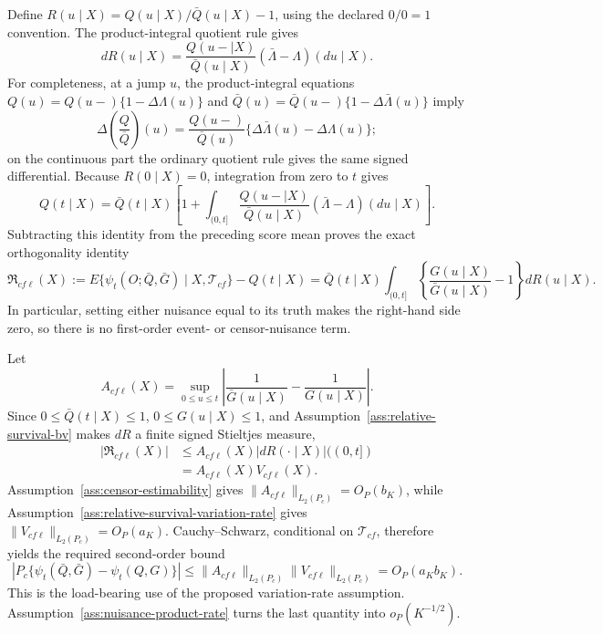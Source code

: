 Define \(R(u\mid X)=Q(u\mid X)/\bar Q(u\mid X)-1\), using the declared \(0/0=1\) convention.  The product-integral quotient rule gives
\[
dR(u\mid X)=
\frac{Q(u-\mid X)}{\bar Q(u\mid X)}
(\bar\Lambda-\Lambda)(du\mid X).
\]
For completeness, at a jump \(u\), the product-integral equations \(Q(u)=Q(u-)\{1-\Delta\Lambda(u)\}\) and \(\bar Q(u)=\bar Q(u-)\{1-\Delta\bar\Lambda(u)\}\) imply
\[
\Delta\!\left(\frac Q{\bar Q}\right)(u)
=\frac{Q(u-)}{\bar Q(u)}
\{\Delta\bar\Lambda(u)-\Delta\Lambda(u)\};
\]
on the continuous part the ordinary quotient rule gives the same signed differential.  Because \(R(0\mid X)=0\), integration from zero to \(t\) gives
\[
Q(t\mid X)=\bar Q(t\mid X)\left[
1+\int_{(0,t]}
\frac{Q(u-\mid X)}{\bar Q(u\mid X)}
(\bar\Lambda-\Lambda)(du\mid X)
\right].
\]
Subtracting this identity from the preceding score mean proves the exact orthogonality identity
\[
\mathfrak R_{cf\ell}(X)
:=E\{\psi_t(O;\bar Q,\bar G)\mid X,\mathcal T_{cf}\}-Q(t\mid X)
=\bar Q(t\mid X)
\int_{(0,t]}
\left\{\frac{G(u\mid X)}{\bar G(u\mid X)}-1\right\}
dR(u\mid X).
\]
In particular, setting either nuisance equal to its truth makes the right-hand side zero, so there is no first-order event- or censor-nuisance term.

Let
\[
A_{cf\ell}(X)=
\sup_{0\le u\le t}
\left|\frac1{\bar G(u\mid X)}-\frac1{G(u\mid X)}\right|.
\]
Since \(0\le \bar Q(t\mid X)\le1\), \(0\le G(u\mid X)\le1\), and Assumption~\ref{ass:relative-survival-bv} makes \(dR\) a finite signed Stieltjes measure,
\[
\begin{aligned}
|\mathfrak R_{cf\ell}(X)|
&\le A_{cf\ell}(X)
|dR(\cdot\mid X)|((0,t])\\
&=A_{cf\ell}(X)V_{cf\ell}(X).
\end{aligned}
\]
Assumption~\ref{ass:censor-estimability} gives \(\|A_{cf\ell}\|_{L_2(P_c)}=O_P(b_K)\), while Assumption~\ref{ass:relative-survival-variation-rate} gives \(\|V_{cf\ell}\|_{L_2(P_c)}=O_P(a_K)\).  Cauchy--Schwarz, conditional on \(\mathcal T_{cf}\), therefore yields the required second-order bound
\[
\left|P_c\{\psi_t(\bar Q,\bar G)-\psi_t(Q,G)\}\right|
\le \|A_{cf\ell}\|_{L_2(P_c)}
\|V_{cf\ell}\|_{L_2(P_c)}
=O_P(a_Kb_K).
\]
This is the load-bearing use of the proposed variation-rate assumption.  Assumption~\ref{ass:nuisance-product-rate} turns the last quantity into \(o_P(K^{-1/2})\).

